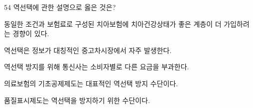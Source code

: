 \begin{question}{54}
역선택에 관한 설명으로 옳은 것은?
\begin{choices}
  \item 동일한 조건과 보험료로 구성된 치아보험에 치아건강상태가 좋은 계층이 더 가입하려는 경향이 있다.
  \item 역선택은 정보가 대칭적인 중고차시장에서 자주 발생한다.
  \item 역선택 방지를 위해 통신사는 소비자별로 다른 요금을 부과한다.
  \item 의료보험의 기초공제제도는 대표적인 역선택 방지 수단이다.
  \item 품질표시제도는 역선택을 방지하기 위한 수단이다.
\end{choices}
\end{question}
